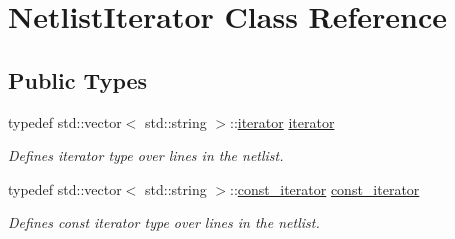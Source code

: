\hypertarget{class_netlist_iterator}{}\section{Netlist\+Iterator Class Reference}
\label{class_netlist_iterator}
\subsection*{Public Types}
\begin{DoxyCompactItemize}
\item 
\mbox{\label{class_netlist_iterator_a01a89af59a5e9cad282a42d1843b3995}} 
typedef std\+::vector$<$ std\+::string $>$\+::\hyperlink{class_netlist_iterator_a01a89af59a5e9cad282a42d1843b3995}{iterator} \hyperlink{class_netlist_iterator_a01a89af59a5e9cad282a42d1843b3995}{iterator}
\begin{DoxyCompactList}\small\item\em Defines iterator type over lines in the netlist. \end{DoxyCompactList}\item 
\mbox{\label{class_netlist_iterator_a2043154071440c87dc775f53d5aa8551}} 
typedef std\+::vector$<$ std\+::string $>$\+::\hyperlink{class_netlist_iterator_a2043154071440c87dc775f53d5aa8551}{const\+\_\+iterator} \hyperlink{class_netlist_iterator_a2043154071440c87dc775f53d5aa8551}{const\+\_\+iterator}
\begin{DoxyCompactList}\small\item\em Defines const iterator type over lines in the netlist. \end{DoxyCompactList}\end{DoxyCompactItemize}

